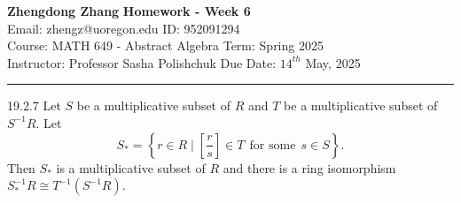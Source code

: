 \documentclass[letterpaper, 12pt]{article}
\begin{document}
\noindent
\large\textbf{Zhengdong Zhang} \hfill \textbf{Homework - Week 6} \\
Email: zhengz@uoregon.edu \hfill ID: 952091294 \\
\normalsize Course: MATH 649 - Abstract Algebra \hfill Term: Spring 2025 \\
Instructor: Professor Sasha Polishchuk \hfill Due Date: $14^{th}$ May, 2025 \\
\noindent\rule{7in}{2.8pt}

\begin{problem}{19.2.7}
Let \(S\) be a multiplicative subset of \(R\) and \(T\) be a multiplicative subset of \(S^{-1}R\). Let 
\[S_*=\left\{ r\in R\mid [\frac{r}{s}]\in T\ \ \text{for some}\ \ s\in S \right\}.\]
Then \(S_*\) is a multiplicative subset of \(R\) and there is a ring isomorphism \(S_*^{-1}R\cong T^{-1}(S^{-1}R)\).
\end{problem}
\end{document}
